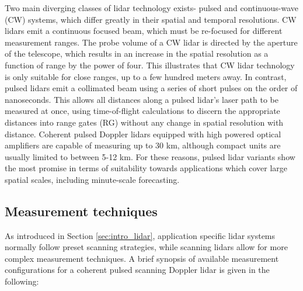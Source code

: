Two main diverging classes of lidar technology exists- pulsed and continuous-wave (CW) systems, which differ greatly in their spatial and temporal resolutions. CW lidars emit a continuous focused beam, which must be re-focused for different measurement ranges. The probe volume of a CW lidar is directed by the aperture of the telescope, which results in an increase in the spatial resolution as a function of range by the power of four. This illustrates that CW lidar technology is only suitable for close ranges, up to a few hundred meters away. In contrast, pulsed lidars emit a collimated beam using a series of short pulses on the order of nanoseconds. This allows all distances along a pulsed lidar's laser path to be measured at once, using time-of-flight calculations to discern the appropriate distances into range gates (RG) without any change in spatial resolution with distance. Coherent pulsed Doppler lidars equipped with high powered optical amplifiers are capable of measuring up to 30 km, although compact units are usually limited to between 5-12 km. For these reasons, pulsed lidar variants show the most promise in terms of suitability towards applications which cover large spatial scales, including minute-scale forecasting.

\clearpage
\subsection{Measurement techniques}
\label{sec:intro_meas_tech}

As introduced in Section \ref{sec:intro_lidar}, application specific lidar systems normally follow preset scanning strategies, while scanning lidars allow for more complex measurement techniques. A brief synopsis of available measurement configurations for a coherent pulsed scanning Doppler lidar is given in the following: 


